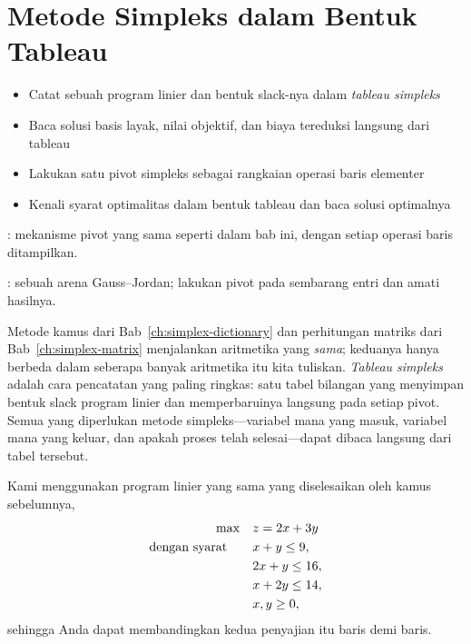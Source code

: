 
\chapter{Metode Simpleks dalam Bentuk Tableau}
\label{ch:simplex-tableau}
\begin{outcome}
\begin{itemize}
\item Catat sebuah program linier dan bentuk slack-nya dalam \emph{tableau simpleks}
\item Baca solusi basis layak, nilai objektif, dan biaya tereduksi langsung dari tableau
\item Lakukan satu pivot simpleks sebagai rangkaian operasi baris elementer
\item Kenali syarat optimalitas dalam bentuk tableau dan baca solusi optimalnya
\end{itemize}
\end{outcome}

\begin{tryit}
: mekanisme pivot yang sama seperti dalam bab ini, dengan setiap operasi baris ditampilkan.

: sebuah arena Gauss--Jordan; lakukan pivot pada sembarang entri dan amati hasilnya.
\end{tryit}




Metode kamus dari Bab~\ref{ch:simplex-dictionary} dan perhitungan matriks dari
Bab~\ref{ch:simplex-matrix} menjalankan aritmetika yang \emph{sama}; keduanya
hanya berbeda dalam seberapa banyak aritmetika itu kita tuliskan. \emph{Tableau
simpleks} adalah cara pencatatan yang paling ringkas: satu tabel bilangan yang
menyimpan bentuk slack program linier dan memperbaruinya langsung pada setiap
pivot. Semua yang diperlukan metode simpleks---variabel mana yang masuk,
variabel mana yang keluar, dan apakah proses telah selesai---dapat dibaca
langsung dari tabel tersebut.

Kami menggunakan program linier yang sama yang diselesaikan oleh kamus sebelumnya,
\begin{equation*}
\begin{aligned}
\max\quad & z = 2x + 3y\\
\mbox{dengan syarat}\quad\quad  & x + y  \le 9,\\
          & 2x + y \le 16,\\
          & x + 2y \le 14,\\
          & x, y \ge 0,
\end{aligned}
\end{equation*}
sehingga Anda dapat membandingkan kedua penyajian itu baris demi baris.

